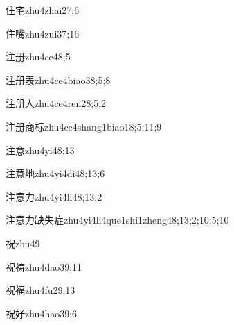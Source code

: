 \begin{verbete}{住宅}{zhu4zhai2}{7;6}
\end{verbete}
\begin{verbete}{住嘴}{zhu4zui3}{7;16}
\end{verbete}
\begin{verbete}{注册}{zhu4ce4}{8;5}
\end{verbete}
\begin{verbete}{注册表}{zhu4ce4biao3}{8;5;8}
\end{verbete}
\begin{verbete}{注册人}{zhu4ce4ren2}{8;5;2}
\end{verbete}
\begin{verbete}{注册商标}{zhu4ce4shang1biao1}{8;5;11;9}
\end{verbete}
\begin{verbete}{注意}{zhu4yi4}{8;13}
\end{verbete}
\begin{verbete}{注意地}{zhu4yi4di4}{8;13;6}
\end{verbete}
\begin{verbete}{注意力}{zhu4yi4li4}{8;13;2}
\end{verbete}
\begin{verbete}{注意力缺失症}{zhu4yi4li4que1shi1zheng4}{8;13;2;10;5;10}
\end{verbete}
\begin{verbete}{祝}{zhu4}{9}
\end{verbete}
\begin{verbete}{祝祷}{zhu4dao3}{9;11}
\end{verbete}
\begin{verbete}{祝福}{zhu4fu2}{9;13}
\end{verbete}
\begin{verbete}{祝好}{zhu4hao3}{9;6}
\end{verbete}
